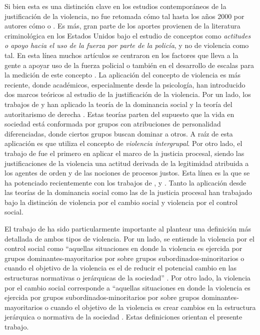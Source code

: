 \documentclass[12pt,twoside]{templates/facsothesis}
\begin{document}
Si bien esta es una distinción clave en los estudios contemporáneos de la justificación de la violencia, no fue retomada cómo tal hasta los años 2000 por autores cómo \citet{Jackson2013} o \citet{Gerber2016}. Es más, gran parte de los aportes provienen de la literatura criminológica en los Estados Unidos bajo el estudio de conceptos como \emph{actitudes o apoyo hacia el uso de la fuerza por parte de la policía}, y no de violencia como tal. En esta línea muchos artículos se centraron en los factores que lleva a la gente a apoyar uso de la fuerza policial \citep{Gamson1970, Arthur1993, Arthur1994, Thompson2004, Perkins2006, Johnson2009} o también en el desarrollo de escalas para la medición de este concepto \citep{Barkan1998, Jefferis2011}. La aplicación del concepto de violencia es más reciente, donde académicos, especialmente desde la psicología, han introducido dos marcos teóricos al estudio de la justificación de la violencia. Por un lado, los trabajos de \citet{Henry2005} y \citet{Gerber2017b} han aplicado la teoría de la dominancia social \citep{Sidanius1999} y la teoría del autoritarismo de derecha \citep{Altemeyer1988}. Estas teorías parten del supuesto que la vida en sociedad está conformada por grupos con atribuciones de personalidad diferenciadas, donde ciertos grupos buscan dominar a otros. A raíz de esta aplicación es que utiliza el concepto de \emph{violencia intergrupal}. Por otro lado, el trabajo de \citet{Jackson2013} fue el primero en aplicar el marco de la justicia procesal, siendo las justificaciones de la violencia una actitud derivada de la legitimidad atribuida a los agentes de orden y de las nociones de procesos justos. Esta línea es la que se ha potenciado recientemente con los trabajos de \citet{Gerber2017a}, \citet{Gerber2017b} y \citet{Bradford2017}. Tanto la aplicación desde las teorías de la dominancia social como las de la justicia procesal han trabajado bajo la distinción de violencia por el cambio social y violencia por el control social.

El trabajo de \citet{Gerber2017a} ha sido particularmente importante al plantear una definición más detallada de ambos tipos de violencia. Por un lado, se entiende la violencia por el control social como ``aquellas situaciones en donde la violencia es ejercida por grupos dominantes-mayoritarios por sobre grupos subordinados-minoritarios o cuando el objetivo de la violencia es el de reducir el potencial cambio en las estructuras normativas o jerárquicas de la sociedad'' \citep[pp.~3-4, traducción mía]{Gerber2017a}. Por otro lado, la violencia por el cambio social corresponde a ``aquellas situaciones en donde la violencia es ejercida por grupos subordinados-minoritarios por sobre grupos dominantes-mayoritarios o cuando el objetivo de la violencia es crear cambios en la estructura jerárquica o normativa de la sociedad \citep[p.4, traducción mía]{Gerber2017a}. Estas definiciones orientan el presente trabajo.
\end{document}
